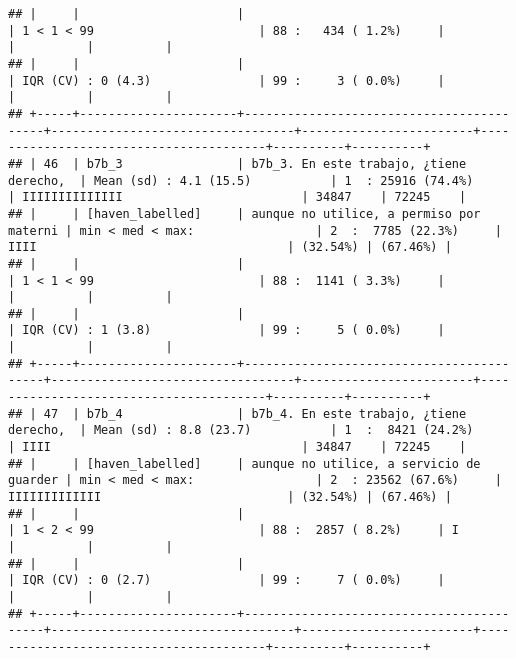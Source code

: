 \documentclass[]{article}
\begin{document}
\begin{verbatim}
## |     |                      |                                          | 1 < 1 < 99                       | 88 :   434 ( 1.2%)     |                                        |          |          |
## |     |                      |                                          | IQR (CV) : 0 (4.3)               | 99 :     3 ( 0.0%)     |                                        |          |          |
## +-----+----------------------+------------------------------------------+----------------------------------+------------------------+----------------------------------------+----------+----------+
## | 46  | b7b_3                | b7b_3. En este trabajo, ¿tiene derecho,  | Mean (sd) : 4.1 (15.5)           | 1  : 25916 (74.4%)     | IIIIIIIIIIIIII                         | 34847    | 72245    |
## |     | [haven_labelled]     | aunque no utilice, a permiso por materni | min < med < max:                 | 2  :  7785 (22.3%)     | IIII                                   | (32.54%) | (67.46%) |
## |     |                      |                                          | 1 < 1 < 99                       | 88 :  1141 ( 3.3%)     |                                        |          |          |
## |     |                      |                                          | IQR (CV) : 1 (3.8)               | 99 :     5 ( 0.0%)     |                                        |          |          |
## +-----+----------------------+------------------------------------------+----------------------------------+------------------------+----------------------------------------+----------+----------+
## | 47  | b7b_4                | b7b_4. En este trabajo, ¿tiene derecho,  | Mean (sd) : 8.8 (23.7)           | 1  :  8421 (24.2%)     | IIII                                   | 34847    | 72245    |
## |     | [haven_labelled]     | aunque no utilice, a servicio de guarder | min < med < max:                 | 2  : 23562 (67.6%)     | IIIIIIIIIIIII                          | (32.54%) | (67.46%) |
## |     |                      |                                          | 1 < 2 < 99                       | 88 :  2857 ( 8.2%)     | I                                      |          |          |
## |     |                      |                                          | IQR (CV) : 0 (2.7)               | 99 :     7 ( 0.0%)     |                                        |          |          |
## +-----+----------------------+------------------------------------------+----------------------------------+------------------------+----------------------------------------+----------+----------+

\end{verbatim}
\end{document}
